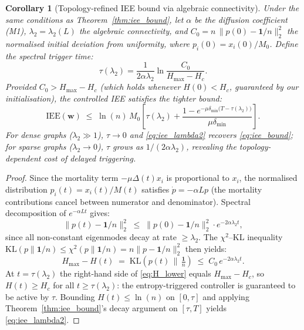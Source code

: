 \documentclass[review,12pt]{elsarticle}
\newcommand{\bfw}{\mathbf{w}}
\newcommand{\IEE}{\mathrm{IEE}}
\newcommand{\Hc}{H_c}
\newcommand{\Hmax}{H_{\max}}
\newcommand{\lambdat}{\lambda_2}
\newtheorem{corollary}{Corollary}
\begin{document}
\begin{corollary}[Topology-refined IEE bound via algebraic connectivity]
\label{cor:lambda2}
Under the same conditions as Theorem~\ref{thm:iee_bound}, let $\alpha$
be the diffusion coefficient (M1), $\lambdat = \lambda_2(L)$ the algebraic
connectivity, and $C_0 = n\,\|p(0) - \mathbf{1}/n\|_2^2$ the normalised
initial deviation from uniformity, where $p_i(0) = x_i(0)/M_0$.
Define the \emph{spectral trigger time}:
\begin{equation}
  \tau(\lambdat) = \frac{1}{2\alpha\lambdat}
    \ln\!\frac{C_0}{\Hmax - \Hc}.
  \label{eq:tau_lambda}
\end{equation}
Provided $C_0 > \Hmax - \Hc$ (which holds whenever $H(0) < \Hc$,
guaranteed by our initialisation), the controlled IEE satisfies the
tighter bound:
\begin{equation}
  \IEE(\bfw) \;\leq\; \ln(n)\,M_0\!\left[
    \tau(\lambdat) +
    \frac{1 - e^{-\mu\delta_{\min}\bigl(T - \tau(\lambdat)\bigr)}}{\mu\delta_{\min}}
  \right].
  \label{eq:iee_lambda2}
\end{equation}
For dense graphs ($\lambdat \gg 1$), $\tau \to 0$ and \eqref{eq:iee_lambda2}
recovers \eqref{eq:iee_bound}; for sparse graphs ($\lambdat \to 0$),
$\tau$ grows as $1/(2\alpha\lambdat)$, revealing the topology-dependent
cost of delayed triggering.
\end{corollary}

\begin{proof}
Since the mortality term $-\mu\Delta(t)x_i$ is proportional to $x_i$,
the normalised distribution $p_i(t) = x_i(t)/M(t)$ satisfies
$\dot{p} = -\alpha Lp$ (the mortality contributions cancel between
numerator and denominator).  Spectral decomposition of $e^{-\alpha Lt}$
gives:
\[
  \|p(t) - \mathbf{1}/n\|_2^2 \;\leq\; \|p(0) - \mathbf{1}/n\|_2^2
    \cdot e^{-2\alpha\lambdat t},
\]
since all non-constant eigenmodes decay at rate $\geq \lambda_2$.
The $\chi^2$--KL inequality $\mathrm{KL}(p\|\mathbf{1}/n) \leq \chi^2(p\|\mathbf{1}/n)
= n\|p - \mathbf{1}/n\|_2^2$ then yields:
\begin{equation}
  \Hmax - H(t) \;=\; \mathrm{KL}\!\left(p(t)\,\Big\|\,\tfrac{\mathbf{1}}{n}\right)
  \;\leq\; C_0\,e^{-2\alpha\lambdat t}.
  \label{eq:H_lower}
\end{equation}
At $t = \tau(\lambdat)$ the right-hand side of \eqref{eq:H_lower} equals
$\Hmax - \Hc$, so $H(t) \geq \Hc$ for all $t \geq \tau(\lambdat)$:
the entropy-triggered controller is guaranteed to be active by $\tau$.
Bounding $H(t) \leq \ln(n)$ on $[0,\tau]$ and applying
Theorem~\ref{thm:iee_bound}'s decay argument on $[\tau, T]$ yields
\eqref{eq:iee_lambda2}.
\end{proof}
\end{document}
